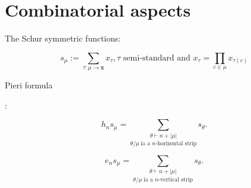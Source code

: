 \documentclass[12pt]{amsart}
\begin{document}
\vspace{-15pt}
\section{Combinatorial aspects}
\vspace{-15pt}
\begin{mdframed}[linecolor=cyan!20,linewidth=3pt,innertopmargin=8pt]
	 \begin{bf} The Schur symmetric functions:\end{bf}
	  \begin{equation} s_\mu:=\underset{\tau:\mu \rightarrow \bm{x}}{\sum} x_\tau, \tau \text{ semi-standard and }x_\tau=\underset{c\in \mu}	{\prod}x_{\tau(c)}\end{equation}
\end{mdframed}

\vspace{-10pt}
\begin{mdframed}[linecolor=red!20,linewidth=3pt,innertopmargin=8pt]
	\begin{bf}Pieri formula\end{bf}:
	\begin{minipage}[t]{7.25cm}\begin{equation} h_ns_\mu=\underset{ \theta/\mu ~\text{ia a $n$-horizontal strip}}{\sum_{\theta \vdash n+|\mu| }} s_\theta.
		\end{equation}
	\end{minipage}
	\begin{minipage}[t]{7.25cm}
		\begin{equation} e_ns_\mu=\underset{ \theta/\mu ~\text{ia a $n$-vertical strip}}{\sum_{\theta \vdash n+|\mu| }} s_\theta.
		\end{equation}
	\end{minipage}

	\vspace{-20pt}
\end{mdframed}
\end{document}
